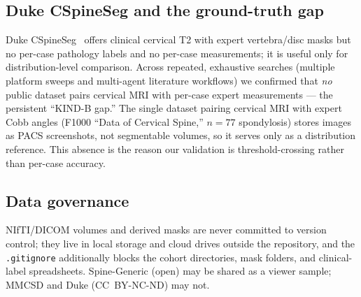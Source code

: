 \subsection{Duke CSpineSeg and the ground-truth gap}
Duke CSpineSeg~\cite{duke2025} offers clinical cervical T2 with expert vertebra/disc masks but no
per-case pathology labels and no per-case measurements; it is useful only for distribution-level
comparison. Across repeated, exhaustive searches (multiple platform sweeps and multi-agent literature
workflows) we confirmed that \emph{no} public dataset pairs cervical MRI with per-case expert
measurements --- the persistent ``KIND-B gap.'' The single dataset pairing cervical MRI with expert Cobb
angles (F1000 ``Data of Cervical Spine,'' $n=77$ spondylosis) stores images as PACS screenshots, not
segmentable volumes, so it serves only as a distribution reference. This absence is the reason our
validation is threshold-crossing rather than per-case accuracy.

\subsection{Data governance}
NIfTI/DICOM volumes and derived masks are never committed to version control; they live in local storage
and cloud drives outside the repository, and the \texttt{.gitignore} additionally blocks the cohort
directories, mask folders, and clinical-label spreadsheets. Spine-Generic (open) may be shared as a
viewer sample; MMCSD and Duke (CC~BY-NC-ND) may not.
